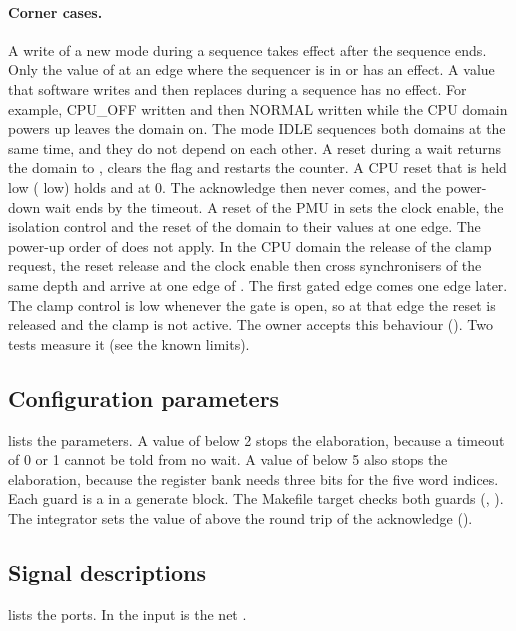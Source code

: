 \paragraph{Corner cases.} A write of a new mode during a sequence takes effect after the sequence ends. Only the value of  at an edge where the sequencer is in  or  has an effect. A value that software writes and then replaces during a sequence has no effect. For example, CPU\_OFF written and then NORMAL written while the CPU domain powers up leaves the domain on. The mode IDLE sequences both domains at the same time, and they do not depend on each other. A reset during a wait returns the domain to , clears the flag and restarts the counter. A CPU reset that is held low ( low) holds  and  at 0. The acknowledge then never comes, and the power-down wait ends by the timeout. A reset of the PMU in  sets the clock enable, the isolation control and the reset of the domain to their  values at one edge. The power-up order of  does not apply. In the CPU domain the release of the clamp request, the reset release and the clock enable then cross synchronisers of the same depth and arrive at one edge of . The first gated edge comes one edge later. The clamp control is low whenever the gate is open, so at that edge the reset is released and the clamp is not active. The owner accepts this behaviour (). Two tests measure it (see the known limits).

\subsection{Configuration parameters}
 lists the parameters. A value of  below 2 stops the elaboration, because a timeout of 0 or 1 cannot be told from no wait. A value of  below 5 also stops the elaboration, because the register bank needs three bits for the five word indices. Each guard is a  in a generate block. The Makefile target  checks both guards (, ). The integrator sets the value of  above the round trip of the acknowledge ().



\subsection{Signal descriptions}
 lists the ports. In  the input  is the net .

